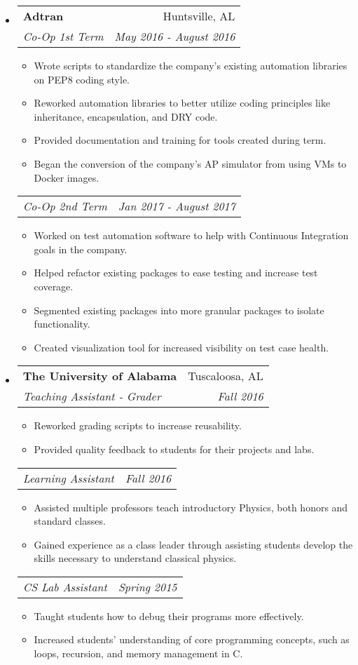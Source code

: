 \documentclass[letterpaper,10pt]{article}
\makeatletter
\newcommand{\resitem}[1]{\item #1 \vspace{-2pt}}
\newcommand{\ressubheading}[4]{
    \begin{tabular*}{6.5in}{l@{\cftdotfill{\cftsecdotsep}\extracolsep{\fill}}r}
      \textbf{#1} & #2 \\
      \textit{#3} & \textit{#4} \\
  \end{tabular*}\vspace{-6pt}}
\newcommand{\secondsubheading}[2]{
    \begin{tabular*}{6.5in}{l@{\cftdotfill{\cftsecdotsep}\extracolsep{\fill}}r}
      \textit{#1} & \textit{#2} \\
  \end{tabular*}\vspace{-6pt}}
\makeatother
\begin{document}
  \begin{itemize}

    \item
      \ressubheading{Adtran}{Huntsville, AL}{Co-Op 1st Term}{May 2016 - August 2016}
      \begin{itemize}
          \resitem{Wrote scripts to standardize the company's existing automation libraries on PEP8 coding style.}
          \resitem{Reworked automation libraries to better utilize coding principles like inheritance, encapsulation, and DRY code.}
          \resitem{Provided documentation and training for tools created during term.}
          \resitem{Began the conversion of the company's AP simulator from using VMs to Docker images.}
      \end{itemize}
      \secondsubheading{Co-Op 2nd Term}{Jan 2017 - August 2017}
      \begin{itemize}
              \resitem{Worked on test automation software to help with Continuous Integration goals in the company.}
              \resitem{Helped refactor existing packages to ease testing and increase test coverage.}
              \resitem{Segmented existing packages into more granular packages to isolate functionality.}
              \resitem{Created visualization tool for increased visibility on test case health.}
      \end{itemize}

    \item
      \ressubheading{The University of Alabama}{Tuscaloosa, AL}{Teaching Assistant - Grader}{Fall 2016}
      \begin{itemize}
          \resitem{Reworked grading scripts to increase reusability.}
          \resitem{Provided quality feedback to students for their projects and labs.}
      \end{itemize}

      \secondsubheading{Learning Assistant}{Fall 2016}
      \begin{itemize}
          \resitem{Assisted multiple professors teach introductory Physics, both honors and standard classes.}
          \resitem{Gained experience as a class leader through assisting students develop the skills necessary to understand classical physics.}
      \end{itemize}

      \secondsubheading{CS Lab Assistant}{Spring 2015}
      \begin{itemize}
          \resitem{Taught students how to debug their programs more effectively.}
          \resitem{Increased students' understanding of core programming concepts, such as loops, recursion, and memory management in C.}
      \end{itemize}

  \end{itemize}
\end{document}
